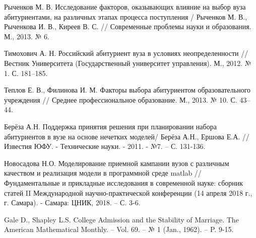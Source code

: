 \begin{thebibliography}{}
	Рыченков М. В. Исследование факторов, оказывающих влияние на выбор вуза абитуриентами, на различных этапах процесса поступления / Рыченков М. В., Рыченкова И. В., 
	Киреев В. С. // Современные проблемы науки и образования. М., 2013. № 6.

	Тимохович А. Н. Российский абитуриент вуза в условиях неопределенности // Вестник 
	Университета (Государственный университет управления). М., 2012. № 1. С. 181–185.

	Теплов Е. В., Филинова И. М. Факторы выбора абитуриентом образовательного учреждения // Среднее профессиональное образование. М., 2013. № 10. С. 43–44.

	Берёза А.Н. Поддержка принятия решения при планировании набора абитуриентов в вузе на основе нечетких моделей/ Берёза А.Н., Ершова Е.А. // Известия ЮФУ. - Технические науки. - 2011. - №7. – С. 131-136.

	Новосадова Н.О. Моделирование приемной кампании вузов с различным качеством и реализация модели в программной среде matlab // Фундаментальные и прикладные исследования в современной науке: сборник статей II Международной научно-практической конференции (14 апреля 2018 г., г. Самара). - Самара: ЦНИК, 2018. – С. 3-6.

	Gale D., Shapley L.S. College Admission and the Stability of Marriage. The American Mathematical Monthly. –
	Vol. 69. – № 1 (Jan., 1962). – P. 9-15.

\end{thebibliography}
\endgroup

\pagebreak